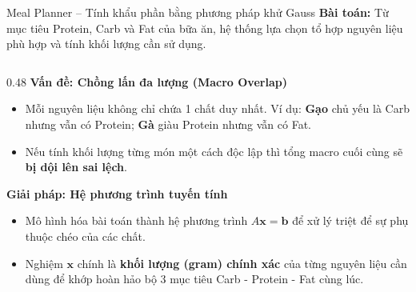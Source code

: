\documentclass[10pt, aspectratio=169]{beamer}
\begin{document}
\begin{frame}{Meal Planner – Tính khẩu phần bằng phương pháp khử Gauss}
    \textbf{Bài toán:} Từ mục tiêu Protein, Carb và Fat của bữa ăn, hệ thống lựa chọn tổ hợp nguyên liệu phù hợp và tính khối lượng cần sử dụng.
    
    \vspace{0.1cm}
    \begin{columns}[T]
        \begin{column}{0.48\textwidth}
            \textbf{\textcolor{NutriGreen!80!black}{Vấn đề: Chồng lấn đa lượng (Macro Overlap)}}
            \vspace{0.05cm}
            
            \begin{itemize}
                \scriptsize \setlength{\itemsep}{2pt}
                \item Mỗi nguyên liệu không chỉ chứa 1 chất duy nhất. Ví dụ: \textbf{Gạo} chủ yếu là Carb nhưng vẫn có Protein; \textbf{Gà} giàu Protein nhưng vẫn có Fat.
                \item Nếu tính khối lượng từng món một cách độc lập thì tổng macro cuối cùng sẽ \textbf{bị dội lên sai lệch}.
            \end{itemize}
            
            \vspace{0.2cm}
            \textbf{\textcolor{NutriGreen!80!black}{Giải pháp: Hệ phương trình tuyến tính}}
            \vspace{0.05cm}
            
            \begin{itemize}
                \scriptsize \setlength{\itemsep}{2pt}
                \item Mô hình hóa bài toán thành hệ phương trình $A\mathbf{x} = \mathbf{b}$ để xử lý triệt để sự phụ thuộc chéo của các chất.
                \item Nghiệm $\mathbf{x}$ chính là \textbf{khối lượng (gram) chính xác} của từng nguyên liệu cần dùng để khớp hoàn hảo bộ 3 mục tiêu Carb - Protein - Fat cùng lúc.
            \end{itemize}
        \end{column}


\end{columns}
\end{frame}
\end{document}
